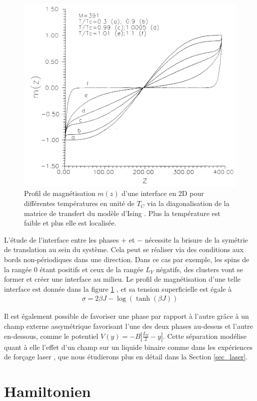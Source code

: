 \begin{figure}
    \centering
    \includegraphics[width=0.5\linewidth]{isingtosos/stecki-profil.png}
    \caption{Profil de magnétisation $m(z)$ d'une interface en 2D pour différentes températures en unité de $T_C$ via la diagonalisation de la matrice de transfert du modèle d'Ising \cite{stecki_magnetization_1994}. Plus la température est faible  et plus elle est localisée.}
    \label{interface-ising}
\end{figure}

L'étude de l'interface entre les phases $+$ et $-$ nécessite la brisure de la symétrie de translation au sein du système. Cela peut se réaliser via des conditions aux bords non-périodiques dans une direction.
Dans ce cas par exemple, les spins de la rangée $0$ étant positifs et ceux de la rangée $L_Y$ négatifs, des clusters vont se former et créer une interface au milieu. 
Le profil de magnétisation d'une telle interface est donnée dans la figure \ref{interface-ising} \cite{stecki_magnetization_1994}, et sa tension superficielle est égale à \cite{abraham_transfer_1973,abraham_interface_1976,richards_numerical_1993} 
\begin{align}
    \sigma = 2 \beta J - \log(\tanh(\beta J))
\end{align}

Il est également possible de favoriser une phase par rapport à l'autre grâce à un champ externe assymétrique favorisant l'une des deux phases au-dessus et l'autre en-dessous, comme le potentiel $V(y) = - B |\frac{L_Y}{2}-y|$. Cette séparation modélise quant à elle l'effet d'un champ  sur un liquide binaire comme dans les expériences de forçage laser \cite{girot_conical_2019}, que nous étudierons plus en détail dans la Section \ref{sec_laser}.

    \section{Hamiltonien}
	
